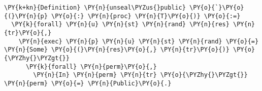 \begin{BVerbatim}[commandchars=\\\{\},codes={\catcode`\$=3\catcode`\^=7\catcode`\_=8},fontsize=\footnotesize]
\PY{k+kn}{Definition} \PY{n}{unseal\PYZus{}public} \PY{o}{`}\PY{o}{(}\PY{n}{p} \PY{o}{:} \PY{n}{proc} \PY{n}{T}\PY{o}{)} \PY{o}{:=}
  \PY{k}{forall} \PY{n}{u} \PY{n}{st} \PY{n}{rand} \PY{n}{res} \PY{n}{tr}\PY{o}{,}
    \PY{n}{exec} \PY{n}{p} \PY{n}{u} \PY{n}{st} \PY{n}{rand} \PY{o}{=} \PY{n}{Some} \PY{o}{(}\PY{n}{res}\PY{o}{,} \PY{n}{tr}\PY{o}{)} \PY{o}{\PYZhy{}\PYZgt{}}
      \PY{k}{forall} \PY{n}{perm}\PY{o}{,}
        \PY{n}{In} \PY{n}{perm} \PY{n}{tr} \PY{o}{\PYZhy{}\PYZgt{}} \PY{n}{perm} \PY{o}{=} \PY{n}{Public}\PY{o}{.}
\end{BVerbatim}
